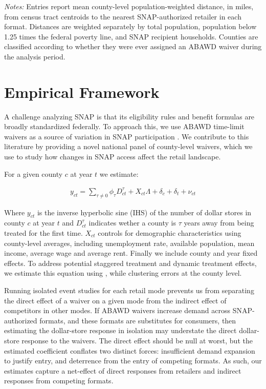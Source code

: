 \documentclass[12pt]{article}
\begin{document}
\begin{table}[!htbp]
\begin{threeparttable}
\begin{tablenotes}[flushleft]
\footnotesize
\item \textit{Notes:} Entries report mean county-level population-weighted distance, in miles, from census tract centroids to the nearest SNAP-authorized retailer in each format. Distances are weighted separately by total population, population below 1.25 times the federal poverty line, and SNAP recipient households. Counties are classified according to whether they were ever assigned an ABAWD waiver during the analysis period.
\end{tablenotes}
\end{threeparttable}
\end{table}

\newpage 

\section{Empirical Framework}

A challenge analyzing SNAP is that its eligibility rules and benefit formulas are broadly standardized federally. To approach this, we use ABAWD time-limit waivers as a source of variation in SNAP participation \citep{ganong_liebman_2018,gray2023employed}. We contribute to this literature by providing a novel national panel of county-level waivers, which we use to study how changes in SNAP access affect the retail landscape. 

For a given county $c$ at year $t$ we estimate:

\begin{align}
    y_{ct} = \sum_{\tau \neq 0}\phi_\tau D_{ct}^\tau + X_{ct} \Lambda + \delta_c + \delta_t  +\nu_{ct} 
\end{align}

Where $y_{ct}$ is the inverse hyperbolic sine (IHS) of the number of dollar stores in county $c$ at year $t$ and $D_{ct}^\tau$ indicates wether a county is $\tau$ years away from being treated for the first time. $X_{ct}$ controls for demographic characteristics using county-level averages, including unemployment rate, available population, mean income, average wage and average rent. Finally we include county and year fixed effects. To address potential staggered treatment and dynamic treatment effects, we estimate this equation using \citet{sun2021estimating}, while clustering errors at the county level.

Running isolated event studies for each retail mode prevents us from separating the direct effect of a waiver on a given mode from the indirect effect of competitors in other modes. If ABAWD waivers increase demand across SNAP-authorized formats, and these formats are substitutes for consumers, then estimating the dollar-store response in isolation may understate the direct dollar-store response to the waivers. The direct effect should be null at worst, but the estimated coefficient conflates two distinct forces: insufficient demand expansion to justify entry, and deterrence from the entry of competing formats. As such, our estimates capture a net-effect of direct responses from retailers and indirect responses from competing formats. 
\end{document}
